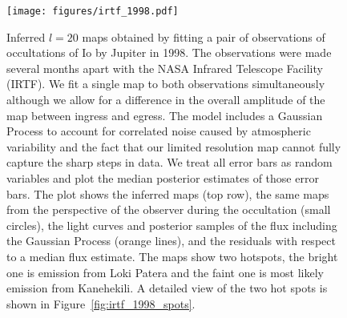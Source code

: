 \documentclass[12pt,dvipsnames]{report}
\begin{document}
\begin{figure}[ht!]
    \begin{centering}
    \texttt{[image: figures/irtf\_1998.pdf]}
    \caption{
Inferred $l=20$ maps obtained by fitting a pair of observations of occultations of Io by Jupiter in 1998.
        The observations were made several months apart with the NASA Infrared Telescope Facility (IRTF).
We fit a single map to both observations simultaneously although we allow for a difference in the overall amplitude of the map between ingress and egress.
The model includes a Gaussian Process to account for correlated noise caused by atmospheric variability and the fact that our limited resolution map cannot fully capture the sharp steps in data.
We treat all error bars as random variables and plot the median posterior estimates of those error bars. 
        The plot shows  the inferred maps (top row), the same maps from the perspective of the observer during the occultation (small circles), the light curves and posterior samples of the flux including the Gaussian Process (orange lines), and the residuals with respect to a median flux estimate.
        The maps show two hotspots, the bright one is emission from Loki Patera and the faint one is most likely emission from Kanehekili.
        A detailed view of the two hot spots is shown in Figure~\ref{fig:irtf_1998_spots}.
    }
     \label{fig:irtf_1998}
    \end{centering}
\end{figure}
%
\end{document}
